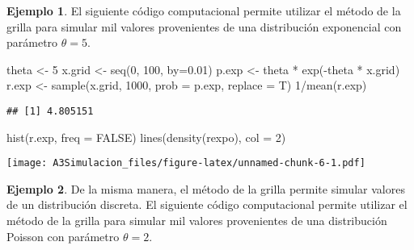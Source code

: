 \documentclass[
  spanish,
]{book}
\newenvironment{Shaded}{\begin{snugshade}}{\end{snugshade}}
\newcommand{\AttributeTok}[1]{\textcolor[rgb]{0.77,0.63,0.00}{#1}}
\newcommand{\ConstantTok}[1]{\textcolor[rgb]{0.00,0.00,0.00}{#1}}
\newcommand{\DecValTok}[1]{\textcolor[rgb]{0.00,0.00,0.81}{#1}}
\newcommand{\FloatTok}[1]{\textcolor[rgb]{0.00,0.00,0.81}{#1}}
\newcommand{\FunctionTok}[1]{\textcolor[rgb]{0.00,0.00,0.00}{#1}}
\newcommand{\NormalTok}[1]{#1}
\newcommand{\OtherTok}[1]{\textcolor[rgb]{0.56,0.35,0.01}{#1}}
\newcommand{\SpecialCharTok}[1]{\textcolor[rgb]{0.00,0.00,0.00}{#1}}
\theoremstyle{definition}
\theoremstyle{definition}
\newtheorem{example}{Ejemplo}[chapter]
\theoremstyle{definition}
\theoremstyle{definition}
\theoremstyle{remark}
\begin{document}
\begin{example}
\protect\hypertarget{exm:unnamed-chunk-5}{}{\label{exm:unnamed-chunk-5} }El siguiente código computacional permite utilizar el método de la grilla para simular mil valores provenientes de una distribución exponencial con parámetro \(\theta = 5\).
\end{example}

\begin{Shaded}
\begin{Highlighting}[]
\NormalTok{theta }\OtherTok{\textless{}{-}} \DecValTok{5}
\NormalTok{x.grid }\OtherTok{\textless{}{-}} \FunctionTok{seq}\NormalTok{(}\DecValTok{0}\NormalTok{, }\DecValTok{100}\NormalTok{, }\AttributeTok{by=}\FloatTok{0.01}\NormalTok{)}
\NormalTok{p.exp }\OtherTok{\textless{}{-}}\NormalTok{ theta }\SpecialCharTok{*} \FunctionTok{exp}\NormalTok{(}\SpecialCharTok{{-}}\NormalTok{theta }\SpecialCharTok{*}\NormalTok{ x.grid)}
\NormalTok{r.exp }\OtherTok{\textless{}{-}} \FunctionTok{sample}\NormalTok{(x.grid, }\DecValTok{1000}\NormalTok{, }\AttributeTok{prob =}\NormalTok{ p.exp, }\AttributeTok{replace =}\NormalTok{ T)}
\DecValTok{1}\SpecialCharTok{/}\FunctionTok{mean}\NormalTok{(r.exp)}
\end{Highlighting}
\end{Shaded}

\begin{verbatim}
## [1] 4.805151
\end{verbatim}

\begin{Shaded}
\begin{Highlighting}[]
\FunctionTok{hist}\NormalTok{(r.exp, }\AttributeTok{freq =} \ConstantTok{FALSE}\NormalTok{)}
\FunctionTok{lines}\NormalTok{(}\FunctionTok{density}\NormalTok{(rexpo), }\AttributeTok{col =} \DecValTok{2}\NormalTok{)}
\end{Highlighting}
\end{Shaded}

\texttt{[image: A3Simulacion\_files/figure-latex/unnamed-chunk-6-1.pdf]}
\begin{example}
\protect\hypertarget{exm:unnamed-chunk-7}{}{\label{exm:unnamed-chunk-7} }De la misma manera, el método de la grilla permite simular valores de un distribución discreta. El siguiente código computacional permite utilizar el método de la grilla para simular mil valores provenientes de una distribución Poisson con parámetro \(\theta = 2\).
\end{example}
\end{document}
